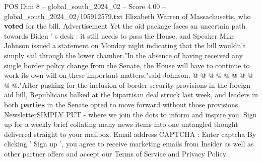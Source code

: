 \begin{textsample}{POS Dim 8 – global\_south\_2024\_02 – Score 4.00 – global\_south\_2024\_02/105912579.txt}
Elizabeth Warren of Massachusetts, who \textbf{voted} for the bill.
Advertisement Yet the aid package faces an uncertain path towards Biden ' s desk : it still needs to pass the House, and Speaker Mike Johnson issued a statement on Monday night indicating that the bill wouldn't simply sail through the lower chamber."In the absence of having received any single border policy change from the Senate, the House will have to continue to work its own will on these important matters,"said Johnson. @ @ @ @ @ @ @ @ @ @."After pushing for the inclusion of border security provisions in the foreign aid bill, Republicans balked at the bipartisan deal struck last week, and leaders in both \textbf{parties} in the Senate opted to move forward without those provisions.
NewsletterSIMPLY PUT - where we join the dots to inform and inspire you.
Sign up for a weekly brief collating many news items into one untangled thought delivered straight to your mailbox.
Email address CAPTCHA : Enter captcha By clicking ' Sign up ', you agree to receive marketing emails from Insider as well as other partner offers and accept our Terms of Service and Privacy Policy

\end{textsample}
